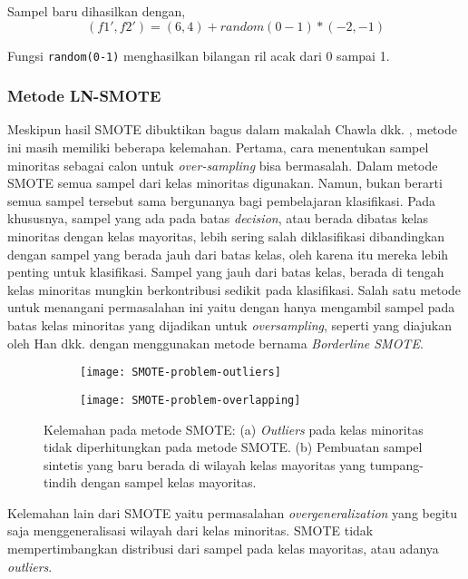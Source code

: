 Sampel baru dihasilkan dengan,
\[
(f1', f2') = (6,4) + random(0-1) * (-2,-1)
\]

Fungsi \texttt{random(0-1)} menghasilkan bilangan ril acak dari 0 sampai 1.


\subsubsection{Metode LN-SMOTE}

Meskipun hasil SMOTE dibuktikan bagus dalam makalah Chawla dkk. \cite{chawla2002smote}, metode ini masih memiliki beberapa kelemahan.
Pertama, cara menentukan sampel minoritas sebagai calon untuk \textit{over-sampling} bisa bermasalah.
Dalam metode SMOTE semua sampel dari kelas minoritas digunakan.
Namun, bukan berarti semua sampel tersebut sama bergunanya bagi pembelajaran klasifikasi.
Pada khususnya, sampel yang ada pada batas \textit{decision}, atau berada dibatas kelas minoritas dengan kelas mayoritas, lebih sering salah diklasifikasi dibandingkan dengan sampel yang berada jauh dari batas kelas, oleh karena itu mereka lebih penting untuk klasifikasi.
Sampel yang jauh dari batas kelas, berada di tengah kelas minoritas mungkin berkontribusi sedikit pada klasifikasi.
Salah satu metode untuk menangani permasalahan ini yaitu dengan hanya mengambil sampel pada batas kelas minoritas yang dijadikan untuk \textit{oversampling}, seperti yang diajukan oleh Han dkk. \cite{han2005borderline} dengan menggunakan metode bernama \textit{Borderline SMOTE}.

\begin{figure}[b!]
	\centering
	\begin{subfigure}[b]{0.4\textwidth}
		\centering
		\texttt{[image: SMOTE-problem-outliers]}
		\caption{}
		\label{fig:smote-outliers}
	\end{subfigure}
	\begin{subfigure}[b]{0.5\textwidth}
		\centering
		\texttt{[image: SMOTE-problem-overlapping]}
		\caption{}
		\label{fig:smote-overlapping}
	\end{subfigure}
	\caption{
	Kelemahan pada metode SMOTE:
(a) \textit{Outliers} pada kelas minoritas tidak diperhitungkan pada metode SMOTE.
(b) Pembuatan sampel sintetis yang baru berada di wilayah kelas mayoritas yang tumpang-tindih dengan sampel kelas mayoritas.
	}
	\label{fig:smote-problems}
\end{figure}

Kelemahan lain dari SMOTE yaitu permasalahan \textit{overgeneralization} yang begitu saja menggeneralisasi wilayah dari kelas minoritas.
SMOTE tidak mempertimbangkan distribusi dari sampel pada kelas mayoritas, atau adanya \textit{outliers}.

